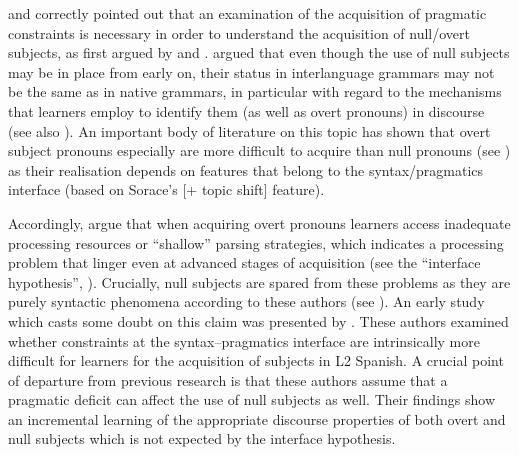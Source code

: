 \documentclass[output=paper]{langscibook}
\begin{document}
\citet{Perez-LerouxGlass1999} and \citet{LicerasDíaz1999} correctly pointed out that an examination of the acquisition of pragmatic constraints is necessary in order to understand the acquisition of null/overt subjects, as first argued by \citet{White1989} and \citet{Liceras1988, Liceras1989}. \citet{LicerasDíaz1999} argued that even though the use of null subjects may be in place from early on, their status in interlanguage grammars may not be the same as in native grammars, in particular with regard to the mechanisms that learners employ to identify them (as well as overt pronouns) in discourse (see also \citealt{Lozano2002,Lozano2006,Hertel2003,Montrul2004, MontrulRodríguezLouro2006,Pladevall2013}). An important body of literature on this topic has shown that overt subject pronouns especially are more difficult to acquire than null pronouns (see \citealt{Sorace2004,Sorace2011}) as {t}heir realisation depends on features that belong to the syntax/pragmatics interface (based on Sorace’s [+ topic shift] feature).

Accordingly, \citet{SoraceFiliaci2006} argue that when acquiring overt pronouns learners access inadequate processing resources or ``shallow'' parsing strategies, which indicates a processing problem that linger even at advanced stages of acquisition (see the ``interface hypothesis'', \citealt{Sorace2011}). Crucially, null subjects are spared from these problems as they are purely syntactic phenomena according to these authors (see \citealt{BellettiEtAl2007,}). An early study which casts some doubt on this claim was presented by \citet{MontrulRodríguezLouro2006}. These authors examined whether constraints at the syntax–pragmatics interface are intrinsically more difficult for learners for the acquisition of subjects in L2 Spanish. A crucial point of departure from previous research is that these authors assume that a pragmatic deficit can affect the use of null subjects as well. Their findings show an incremental learning of the appropriate discourse properties of both overt and null subjects which is not expected by the interface hypothesis.
\end{document}
